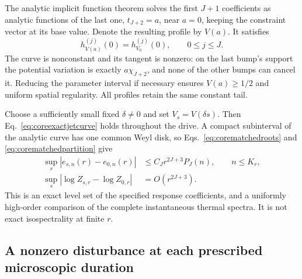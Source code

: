 \documentclass[aps,pra,reprint,superscriptaddress,longbibliography]{revtex4-2}
\begin{document}
The analytic implicit function theorem solves the first $J+1$
coefficients as analytic functions of the last one,
$t_{J+2}=a$, near $a=0$, keeping the constraint vector at its base
value. Denote the resulting profile by $V(a)$. It satisfies
\begin{equation}
 h_{V(a)}^{(j)}(0)=h_{V_0}^{(j)}(0),\qquad0\le j\le J.
 \label{eq:coreexactjetcurve}
\end{equation}
The curve is nonconstant and its tangent is nonzero: on the last
bump's support the potential variation is exactly $a\chi_{J+2}$,
and none of the other bumps can cancel it. Reducing the parameter
interval if necessary ensures $V(a)\ge1/2$ and uniform spatial
regularity. All profiles retain the same constant tail.

Choose a sufficiently small fixed $\delta\ne0$ and set
$V_s=V(\delta s)$. Then Eq.~\eqref{eq:coreexactjetcurve} holds
throughout the drive. A compact subinterval of the analytic curve has
one common Weyl disk, so Eqs.~\eqref{eq:corematchedroots} and
\eqref{eq:corematchedpartition} give
\begin{align}
 \sup_s|e_{s,n}(r)-e_{0,n}(r)|
     &\le C_Jr^{2J+3}P_J(n),\qquad n\le K_r,\nonumber\\
 \sup_s|\log Z_{s,r}-\log Z_{0,r}|&=O(r^{2J+3}).
 \label{eq:corewholepathstationary}
\end{align}
This is an exact level set of the specified response coefficients,
and a uniformly high-order comparison of the complete instantaneous
thermal spectra. It is not exact isospectrality at finite $r$.

\subsection{A nonzero disturbance at each prescribed microscopic duration}
\end{document}
